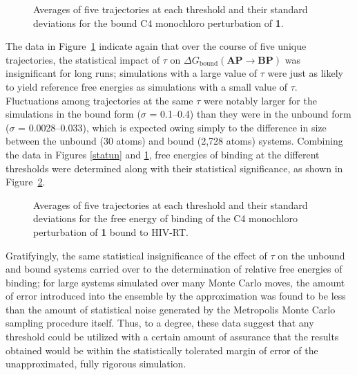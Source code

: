 \documentclass[12pt]{report}
\def\figlab{Figure}\def\figslab{\figlab s}
\newcommand*\fig[1]{\figlab~\ref{#1}}
\begin{document}
\begin{figure}[htbp]
\centering

\caption{Averages of five trajectories at each threshold and their standard deviations for the bound C4 monochloro perturbation of \textbf{1}.}
\label{statb}
\end{figure}

The data in \fig{statb} indicate again that over the course of five unique trajectories, the statistical impact of $\tau$ on 
$\Delta G_{\textrm{bound}}(\textbf{AP} \longrightarrow \textbf{BP})$ was insignificant for long runs; simulations with a large value of $\tau$ were just as likely to yield reference free energies as simulations with a small value of $\tau$. Fluctuations among trajectories at the same $\tau$ were notably larger for the simulations in the bound form ($\sigma$ = 0.1--0.4) than they were in the unbound form ($\sigma$ = 0.0028--0.033), which is expected owing simply to the difference in size between the unbound (30 atoms) and bound (2,728 atoms) systems. Combining the data in Figures \ref{statun} and \ref{statb}, free energies of binding at the different thresholds were determined along with their statistical significance, as shown in \fig{statbind}.

\begin{figure}[htbp]
\centering

\caption{Averages of five trajectories at each threshold and their standard deviations for the free energy of binding of the C4 monochloro perturbation of \textbf{1} bound to HIV-RT.}
\label{statbind}
\end{figure}

Gratifyingly, the same statistical insignificance of the effect of $\tau$ on the unbound and bound systems carried over to the determination of relative free energies of binding; for large systems simulated over many Monte Carlo moves, the amount of error introduced into the ensemble by the approximation was found to be less than the amount of statistical noise generated by the Metropolis Monte Carlo sampling procedure itself. Thus, to a degree, these data suggest that any threshold could be utilized with a certain amount of assurance that the results obtained would be within the statistically tolerated margin of error of the unapproximated, fully rigorous simulation.

\end{document}
